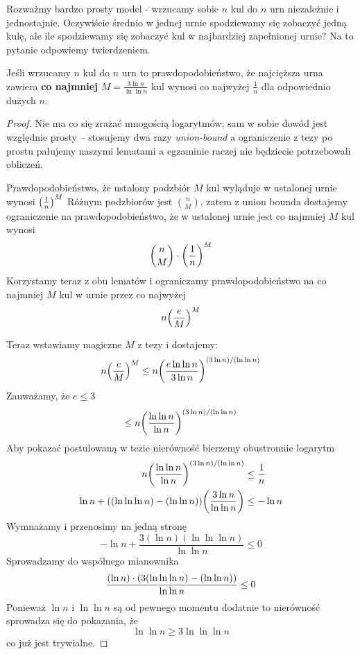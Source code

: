 Rozważmy bardzo prosty model - wrzucamy sobie \( n \) kul do \( n \) urn niezależnie i jednostajnie.
Oczywiście średnio w jednej urnie spodziewamy się zobaczyć jedną kulę, ale ile spodziewamy się zobaczyć kul w najbardziej zapełnionej urnie?
Na to pytanie odpowiemy twierdzeniem.
\begin{theorem}[Lemat 5.1 P\&C]
	\label{balls-and-bins-max-load-upper-bound}
	Jeśli wrzucamy \( n \) kul do \( n \) urn to prawdopodobieństwo, że najcięższa urna zawiera
	\textbf{co najmniej} \( M = \frac{3 \ln n}{\ln \ln n} \) kul wynosi co najwyżej \( \frac{1}{n} \) dla odpowiednio dużych \( n \).
\end{theorem}
\begin{proof}
	Nie ma co się zrażać mnogością logarytmów; sam w sobie dowód jest względnie prosty -- stosujemy dwa razy \textit{union-bound} a ograniczenie z tezy po prostu pałujemy naszymi lematami a egzaminie raczej nie będziecie potrzebowali obliczeń.


	Prawdopodobieństwo, że ustalony podzbiór \( M \) kul wyląduje w ustalonej urnie wynosi
	\( \left(\frac{1}{n}\right)^M \)
	Różnym podzbiorów jest \( \binom{n}{M} \), zatem z union bounda dostajemy ograniczenie na prawdopodobieństwo, że w ustalonej urnie jest co najmniej \( M \) kul wynosi
	\[
		\binom{n}{M} \cdot \left(\frac{1}{n}\right)^M
	\]
	Korzystamy teraz z obu lematów i ograniczamy prawdopodobieństwo na co najmniej \( M \) kul w urnie przez co najwyżej
	\[
		n\pars{\frac{e}{M}}^M
	\]

	Teraz wstawiamy magiczne \( M \) z tezy i dostajemy:
	\[
		n\pars{\frac{e}{M}}^M \leq n\pars{\frac{e \ln \ln n}{3 \ln n}}^{(3 \ln n)/(\ln \ln n)}
	\]
	Zauważamy, że \( e \leq 3 \)
	\[
		\leq n\pars{\frac{\ln \ln n}{\ln n}}^{(3 \ln n)/(\ln \ln n)}
	\]
	Aby pokazać postulowaną w tezie nierówność bierzemy obustronnie logarytm
	\begin{align*}
		n\pars{\frac{\ln \ln n}{\ln n}}^{(3 \ln n)/(\ln \ln n)}                      & \leq \frac{1}{n} \\
		\ln n + \pars{(\ln \ln \ln n) - (\ln \ln n)}\pars{\frac{3 \ln n}{\ln \ln n}} & \leq -\ln n
	\end{align*}
	Wymnażamy i przenosimy na jedną stronę
	\[
		-\ln n + \frac{3 (\ln n)(\ln \ln \ln n)}{\ln \ln n} \leq 0
	\]
	Sprowadzamy do wspólnego mianownika
	\[
		\frac{(\ln n) \cdot \left(3(\ln \ln \ln n) - (\ln \ln n)\right)}{\ln \ln n} \leq 0
	\]
	Ponieważ \( \ln n \) i \(\ln \ln n\) są od pewnego momentu dodatnie
	to nierówność sprowadza się do pokazania, że
	\[
		\ln \ln n \geq 3 \ln \ln \ln n
	\]
	co już jest trywialne.

\end{proof}